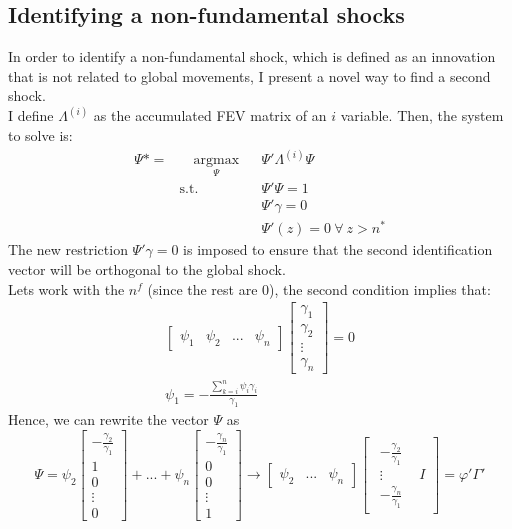 \documentclass[12pt, a4paper]{article}
\begin{document}
\subsection{Identifying a non-fundamental shocks}
In order to identify a non-fundamental shock, which is defined as an innovation that is not related to global movements, I present a novel way to find a second shock. \\
I define $\Lambda^{(i)}$ as the accumulated FEV matrix of an $i$ variable. Then, the system to solve is:
\begin{equation*}
\begin{aligned}
\Psi* =  & \quad \underset{\Psi}{\text{argmax}}
& & \Psi' \Lambda^{(i)} \Psi \\
& \text{s.t.}
& & \Psi' \Psi = 1\\
& & & \Psi'\gamma = 0 \\
& & & \Psi'(z) = 0 \ \forall \ z > n^*
\end{aligned}
\end{equation*}
The new restriction $\Psi' \gamma = 0$ is imposed to ensure that the second identification vector will be orthogonal to the global shock.\\
Lets work with the $n^f$ (since the rest are 0), the second condition implies that:
\begin{align*}
	\begin{bmatrix}
		\psi_1 & \psi_2 & ... &\psi_n
	\end{bmatrix}
	\begin{bmatrix}
		\gamma_1 \\ \gamma_2 \\ \vdots \\ \gamma_n
	\end{bmatrix} = 0 \\
	\psi_1 = -\frac{\sum_{k=i}^{n}\psi_i\gamma_i}{\gamma_1}
\end{align*}
Hence, we can rewrite the vector $\Psi$ as
\begin{equation*}
	\Psi = \psi_2 	\begin{bmatrix}
						-\frac{\gamma_2}{\gamma_1} \\ 1 \\ 0 \\ \vdots \\ 0
					\end{bmatrix}
	+ ... + \psi_n
	\begin{bmatrix}
					-\frac{\gamma_n}{\gamma_1} \\ 0 \\ 0 \\ \vdots \\ 1
				\end{bmatrix}
				\rightarrow
	\begin{bmatrix}\psi_2 & ...&\psi_n\end{bmatrix}
	\begin{bmatrix} \begin{matrix} -\frac{\gamma_2}{\gamma_1}\\ \vdots \\ -\frac{\gamma_n}{\gamma_1}\end{matrix} & I \end{bmatrix} = \varphi'\Gamma'
\end{equation*}
\end{document}

